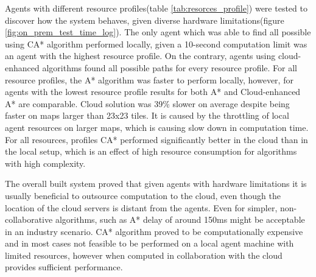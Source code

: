 Agents with different resource profiles(table \ref{tab:resorces_profile}) were tested to discover how the system behaves, given diverse hardware limitations(figure \ref{fig:on_prem_test_time_log}). The only agent which was able to find all possible using CA* algorithm performed locally, given a 10-second computation limit was an agent with the highest resource profile. On the contrary, agents using cloud-enhanced algorithms found all possible paths for every resource profile. For all resource profiles, the A* algorithm was faster to perform locally, however, for agents with the lowest resource profile results for both A* and Cloud-enhanced A* are comparable. Cloud  solution was 39\% slower on average despite being faster on maps larger than 23x23 tiles. It is caused by the throttling of local agent resources on larger maps, which is causing slow down in computation time. For all resources, profiles CA* performed significantly better in the cloud than in the local setup, which is an effect of high resource consumption for algorithms with high complexity.

The overall built system proved that given agents with hardware limitations it is usually beneficial to outsource computation to the cloud, even though the location of the cloud servers is distant from the agents. Even for simpler, non-collaborative algorithms, such as A* delay of around 150ms might be acceptable in an industry scenario. CA* algorithm proved to be computationally expensive and in most cases not feasible to be performed on a local agent machine with limited resources, however when computed in collaboration with the cloud provides sufficient performance.
